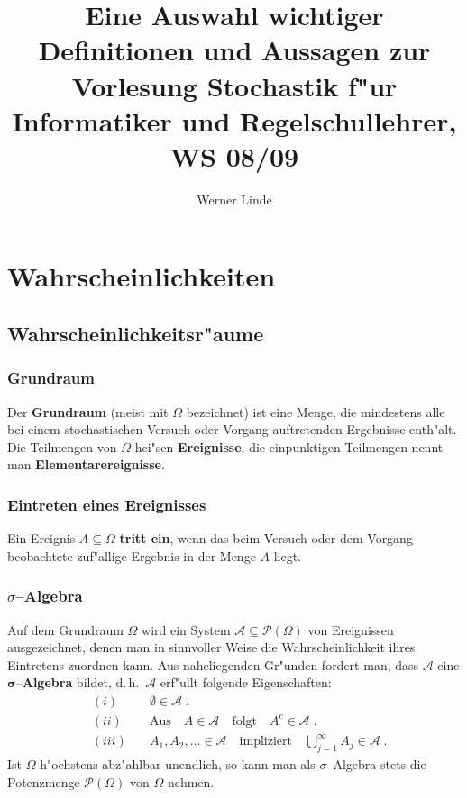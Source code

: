 \documentclass[ngerman,draft,parskip=half,twoside]{scrartcl}
\newcommand*{\Algeb}{\mathcal{A}}   %
\newcommand*{\PotM}{\mathcal{P}}    %
\begin{document}
\renewcommand{\labelenumi}{\arabic{enumi}.}
\renewcommand{\labelenumii}{\arabic{enumi}.\arabic{enumii}}


\title{Eine Auswahl wichtiger Definitionen und Aussagen
 zur Vorlesung
\glqq{}Stochastik f"ur Informatiker und Regelschullehrer\grqq{}, WS 08/09}

\author{Werner Linde}
\maketitle

\section{Wahrscheinlichkeiten}
\subsection{Wahrscheinlichkeitsr"aume}

\subsubsection{Grundraum}
Der \textbf{Grundraum} (meist mit $\Omega$ bezeichnet) ist eine Menge,
die mindestens alle bei einem stochastischen Versuch oder Vorgang
auftretenden Ergebnisse enth"alt. Die Teilmengen von $\Omega$ hei"sen \textbf{Ereignisse},
die einpunktigen Teilmengen nennt man \textbf{Elementarereignisse}.

\subsubsection{Eintreten eines Ereignisses}
Ein Ereignis $A\subseteq \Omega$ \textbf{tritt ein}, wenn das beim Versuch oder dem Vorgang
beobachtete zuf"allige Ergebnis in der Menge
$A$ liegt.

\subsubsection{$\sigma$--Algebra}
Auf dem Grundraum $\Omega$ wird ein System $\Algeb\subseteq \PotM(\Omega)$  von Ereignissen
ausgezeichnet, denen man in sinnvoller Weise die
Wahrscheinlichkeit ihres Eintretens zuordnen kann. Aus naheliegenden Gr"unden fordert man,
dass $\Algeb$ eine $\mathbf \sigma$--\textbf{Algebra} bildet, d.\,h.~$\Algeb$ erf"ullt
folgende Eigenschaften$\colon$
\begin{eqnarray*}
&(i)&\quad\emptyset\in\Algeb\;.\\
&(ii)&\quad\mbox{Aus}\quad A\in\Algeb\quad\mbox{folgt}\quad A^c\in \Algeb\;.\\
&(iii)&\quad
A_1,A_2,\ldots\in \Algeb \quad \mbox{impliziert}\quad \bigcup_{j=1}^\infty A_j\in\Algeb\;.
\end{eqnarray*}
Ist $\Omega$ h"ochstens abz"ahlbar unendlich, so kann man als $\sigma$--Algebra stets die
Potenzmenge $\PotM(\Omega)$ von $\Omega$ nehmen.
\end{document}
